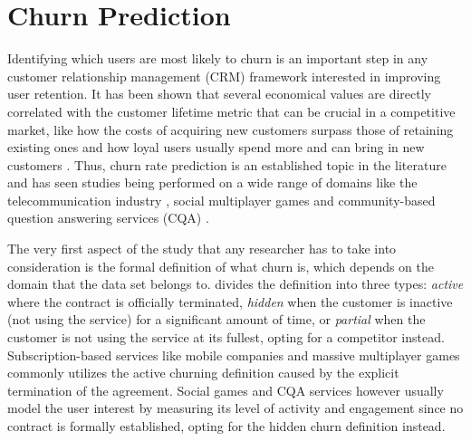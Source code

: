 \documentclass{kththesis}
\begin{document}
\section{Churn Prediction}

Identifying which users are most likely to churn is an important step in any customer relationship management (CRM) framework interested in improving user retention. It has been shown that several economical values are directly correlated with the customer lifetime metric that can be crucial in a competitive market, like how the costs of acquiring new customers surpass those of retaining existing ones and how loyal users usually spend more and can bring in new customers \citep{GurAli2014}. Thus, churn rate prediction is an established topic in the literature and has seen studies being performed on a wide range of domains like the telecommunication industry \citep{Lu2014}\citep{Khan2015}\citep{Hassouna2015}, social multiplayer games \citep{Borbora2011}\citep{Runge2014} and community-based question answering services (CQA) \citep{Pudipeddi2014}\citep{Dror2012}. 

The very first aspect of the study that any researcher has to take into consideration is the formal definition of what churn is, which depends on the domain that the data set belongs to. \citep{lazarov2007churn} divides the definition into three types: \emph{active} where the contract is officially terminated, \emph{hidden} when the customer is inactive (not using the service) for a significant amount of time, or \emph{partial} when the customer is not using the service at its fullest, opting for a competitor instead. Subscription-based services like mobile companies \citep{Lu2014}\citep{Hassouna2015} and massive multiplayer games \citep{Borbora2011} commonly utilizes the active churning definition caused by the explicit termination of the agreement. Social games \citep{Runge2014}\citep{Drachen2016RapidPO} and CQA services \citep{Pudipeddi2014}\citep{Dror2012} however usually model the user interest by measuring its level of activity and engagement since no contract is formally established, opting for the hidden churn definition instead. 
\end{document}
